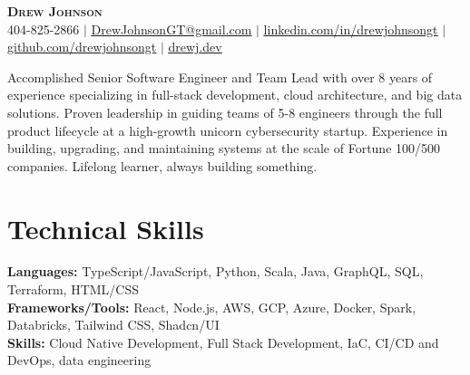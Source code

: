 \documentclass[letterpaper,11pt]{article}
\newcommand{\overviewSection}[1]{%
  \begin{center}
    \small #1 \par
  \end{center}
}
\begin{document}

\begin{center}
	\textbf{\Huge \scshape Drew Johnson} \\ \vspace{1pt}
	\small 404-825-2866 $|$ \href{mailto:x@x.com}{\underline{DrewJohnsonGT@gmail.com}} $|$ 
	\href{https://linkedin.com/in/drewjohnsongt}{\underline{linkedin.com/in/drewjohnsongt}} $|$
	\href{https://github.com/drewjohnsongt}{\underline{github.com/drewjohnsongt}} $|$
	\href{https://drewj.dev/}{\underline{drewj.dev}}
\end{center}


\overviewSection {Accomplished Senior Software Engineer and Team Lead with over 8 years of experience specializing in full-stack development, cloud architecture, and big data solutions. Proven leadership in guiding teams of 5-8 engineers through the full product lifecycle at a high-growth unicorn cybersecurity startup. Experience in building, upgrading, and maintaining systems at the scale of Fortune 100/500 companies. Lifelong learner, always building something.}

\section{Technical Skills}
\begin{itemize}[leftmargin=0.15in, label={}]
	\small{\item{
		\textbf{Languages:}{ TypeScript/JavaScript, Python, Scala, Java, GraphQL, SQL, Terraform, HTML/CSS} \\
		\textbf{Frameworks/Tools:}{ React, Node.js, AWS, GCP, Azure, Docker, Spark, Databricks, Tailwind CSS, Shadcn/UI} \\
		\textbf{Skills:}{ Cloud Native Development, Full Stack Development, IaC, CI/CD and DevOps, data engineering}
        }}
\end{itemize}
 
\end{document}
